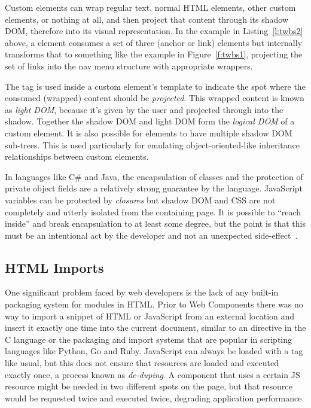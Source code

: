 Custom elements can wrap regular text, normal HTML elements, other custom elements, or nothing at all,
and then project that content through its shadow DOM, 
therefore into its visual representation.
In the example in Listing~\ref{l:twbs2} above, 
a \textbf{} element consumes a set of three 
\textbf{} (anchor or link) elements but internally transforms that to something like the example in Figure~\ref{f:twbs1}, 
projecting the set of links into the nav menu structure with appropriate wrappers.

The  tag is used inside a custom element's template to indicate the spot where the consumed (wrapped) content should be \textit{projected}. 
This wrapped content is known as 
\textit{light DOM}, 
because it's given by the user and projected through into the shadow.
Together the shadow DOM and light DOM form the \textit{logical DOM} of a custom element.
It is also possible for elements to have multiple shadow DOM sub-trees. 
This is used particularly for emulating object-oriented-like inheritance relationships between custom elements.

In languages like C\# and Java, the encapsulation of classes and the protection of private object fields are a relatively strong guarantee by the language.
JavaScript variables can be protected by \textit{closures}
but shadow DOM and CSS are not completely and utterly isolated from the containing page.
It is possible to ``reach inside'' and break encapsulation to at least some degree, 
but the point is that this must be an intentional act by the developer and not an unexpected side-effect~\cite{bidelman2014}.

\subsection{HTML Imports}
One significant problem faced by web developers is the lack of any built-in packaging system for modules in HTML.
Prior to Web Components there was no way to import a snippet of HTML or JavaScript from an external location and insert it exactly one time into the current document, 
similar to an  directive in the C language or the packaging and import systems that are popular in scripting languages
like Python, Go and Ruby. 
JavaScript can always be loaded with a  tag like usual, but this does not ensure that resources are loaded and executed exactly once, a process known as \textit{de-duping}.
A component that uses a certain JS resource might be needed in two different spots on the page, 
but that resource would be requested twice and executed twice, degrading application performance.

